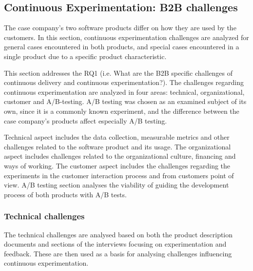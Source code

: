 \documentclass[english, grading]{tktltiki2}
\theoremstyle{definition}
\theoremstyle{remark}
\begin{document}


\subsection{Continuous Experimentation: B2B challenges}
The case company's two software products differ on how they are used by the customers. In this section, continuous experimentation challenges are analyzed for general cases encountered in both products, and special cases encountered in a single product due to a specific product characteristic. 

This section addresses the RQ1 (i.e. What are the B2B specific challenges of continuous delivery and continuous experimentation?). The challenges regarding continuous experimentation are analyzed in four areas: technical, organizational, customer and A/B-testing. A/B testing was chosen as an examined subject of its own, since it is a commonly known experiment, and the difference between the case company's products affect especially A/B testing.  

Technical aspect includes the data collection, measurable metrics and other challenges related to the software product and its usage. The organizational aspect includes challenges related to the organizational culture, financing and ways of working. The customer aspect includes the challenges regarding the experiments in the customer interaction process and from customers point of view. A/B testing section analyses the viability of guiding the development process of both products with A/B tests.
\subsubsection{Technical challenges}
The technical challenges are analysed based on both the product description documents and sections of the interviews focusing on experimentation and feedback. These are then used as a basis for analysing challenges influencing continuous experimentation.
\end{document}
